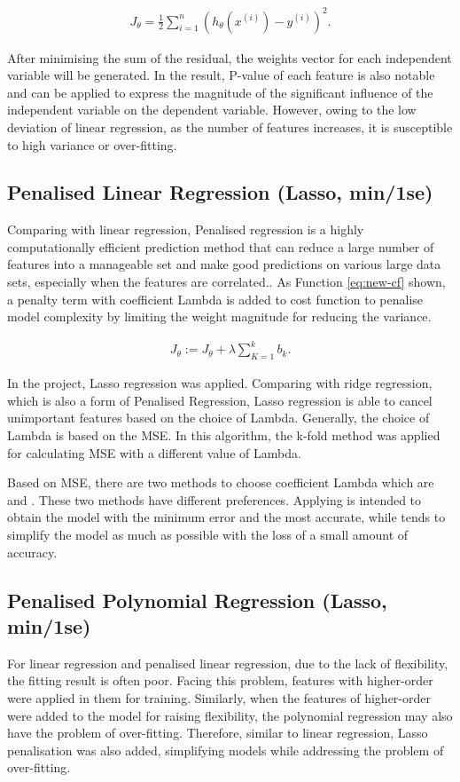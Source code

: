 \begin{eqnarray}
    J_\theta = \frac{1}{2} \sum_{i=1}^{n}{(h_\theta (x^{(i)}) - y^{(i)})^2}.
    \label{eq:cf}
\end{eqnarray}

After minimising the sum of the residual, the weights vector for each independent variable will be generated. In the result, P-value of each feature is also notable and can be applied to express the magnitude of the significant influence of the independent variable on the dependent variable. However, owing to the low deviation of linear regression, as the number of features increases, it is susceptible to high variance or over-fitting.

\subsection{Penalised Linear Regression (Lasso, min/1se)}
Comparing with linear regression, Penalised regression is a highly computationally efficient prediction method that can reduce a large number of features into a manageable set and make good predictions on various large data sets, especially when the features are correlated.\cite{bowles2015machine}. As Function \ref{eq:new-cf} shown, a penalty term with coefficient Lambda is added to cost function to penalise model complexity by limiting the weight magnitude for reducing the variance.

\begin{eqnarray}
    J_\theta := J_\theta + \lambda \sum_{K=1}^{k}{b_k}.
    \label{eq:new-cf}
\end{eqnarray}

In the project, Lasso regression was applied. Comparing with ridge regression, which is also a form of Penalised Regression, Lasso regression is able to cancel unimportant features based on the choice of Lambda. Generally, the choice of Lambda is based on the MSE. In this algorithm, the k-fold method was applied for calculating MSE with a different value of Lambda. 

Based on MSE, there are two methods to choose coefficient Lambda which are  and . These two methods have different preferences. Applying  is intended to obtain the model with the minimum error and the most accurate, while  tends to simplify the model as much as possible with the loss of a small amount of accuracy.

\subsection{Penalised Polynomial Regression (Lasso, min/1se)}
For linear regression and penalised linear regression, due to the lack of flexibility, the fitting result is often poor. Facing this problem, features with higher-order were applied in them for training. Similarly, when the features of higher-order were added to the model for raising flexibility, the polynomial regression may also have the problem of over-fitting. Therefore, similar to linear regression, Lasso penalisation was also added, simplifying models while addressing the problem of over-fitting.

